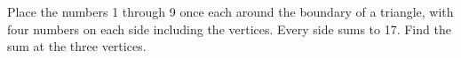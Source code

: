Place the numbers 1 through 9 once each around the boundary of a triangle, with four numbers on each side including the vertices. Every side sums to 17. Find the sum at the three vertices.
